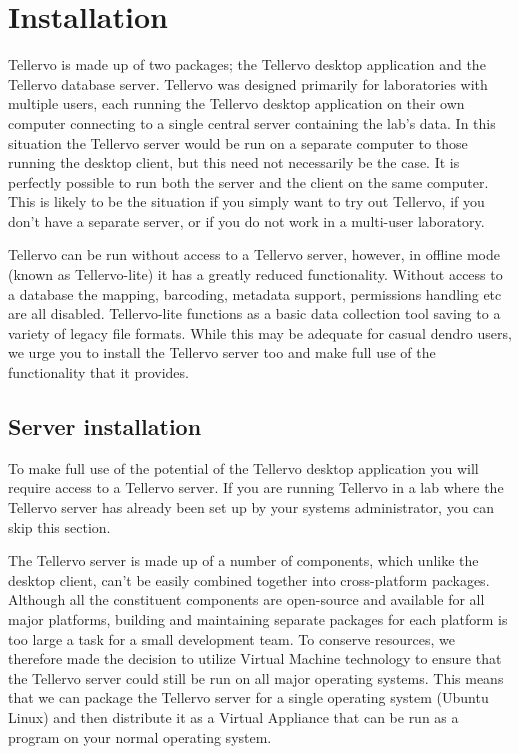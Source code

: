 
\chapter{Installation}
\label{txt:installation}
Tellervo is made up of two packages; the Tellervo desktop application and the Tellervo database server.  Tellervo was designed primarily for laboratories with multiple users, each running the Tellervo desktop application on their own computer connecting to a single central server containing the lab's data.  In this situation the Tellervo server would be run on a separate computer to those running the desktop client, but this need not necessarily be the case.  It is perfectly possible to run both the server and the client on the same computer.  This is likely to be the situation if you simply want to try out Tellervo, if you don't have a separate server, or if you do not work in a multi-user laboratory.

Tellervo can be run without access to a Tellervo server, however, in offline mode (known as Tellervo-lite) it has a greatly reduced functionality.  Without access to a database the mapping, barcoding, metadata support, permissions handling etc are all disabled.  Tellervo-lite functions as a basic data collection tool saving to a variety of legacy file formats.  While this may be adequate for casual dendro users, we urge you to install the Tellervo server too and make full use of the functionality that it provides.


\section{Server installation}
To make full use of the potential of the Tellervo desktop application you will require access to a Tellervo server.  If you are running Tellervo in a lab where the Tellervo server has already been set up by your systems administrator, you can skip this section.

The Tellervo server is made up of a number of components, which unlike the desktop client, can't be easily combined together into cross-platform packages.  Although all the constituent components are open-source and available for all major platforms, building and maintaining separate packages for each platform is too large a task for a small development team.  To conserve resources, we therefore made the decision to utilize Virtual Machine technology to ensure that the Tellervo server could still be run on all major operating systems.  This means that we can package the Tellervo server for a single operating system (Ubuntu Linux) and then distribute it as a Virtual Appliance that can be run as a program on your normal operating system. 

